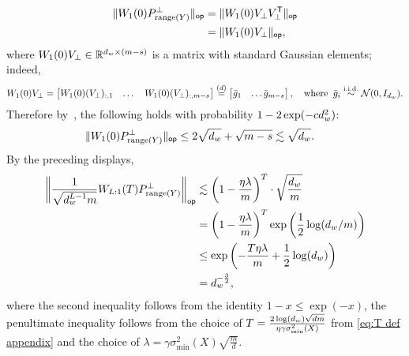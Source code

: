 \begin{align*}
    \lVert W_{1}(0) P_{\mathrm{range}(Y)}^{\perp}\rVert_{\mathsf{op}} &=
    \lVert W_{1}(0) V_{\perp} V_{\perp}^{\mathsf{T}}\rVert_{\mathsf{op}} \\
    &=
    \lVert W_{1}(0) V_{\perp}\rVert_{\mathsf{op}},
\end{align*}
where $W_{1}(0) V_{\perp} \in \mathbb{R}^{d_{w} \times (m - s)}$ is a matrix with standard Gaussian elements; indeed,
\[
    W_{1}{(0)} V_{\perp} = \begin{bmatrix}
        W_{1}(0) (V_{\perp})_{:, 1} &
        \dots &
        W_{1}(0) (V_{\perp})_{:, m - s}
    \end{bmatrix} \overset{(d)}{=}
    \begin{bmatrix}
        \bar{g}_1 & \dots \bar{g}_{m - s}
    \end{bmatrix},
    \quad \text{where} \;\;
    \bar{g}_i \overset{\mathrm{i.i.d.}}{\sim} \mathcal{N}(0, I_{d_{w}}).
\]
Therefore by~\citep[Corollary 7.3.3]{Ver18}, the following holds
with probability $1-2\exp(-c d_{w}^2)$:
\begin{align*}
	\lVert W_{1}(0) P_{\mathrm{range}(Y)}^{\perp}\rVert_{\mathsf{op}} & \leq
    2\sqrt{d_{w}} + \sqrt{m - s}
    \lesssim \sqrt{d_{w}}.
\end{align*}
By the preceding displays,
\begin{align}
	\opnorm[\bigg]{\frac{1}{\sqrt{\dhid^{L-1} \din}} W_{L:1}(T) P_{\range(Y)}^{\perp}}
	 & \lesssim \left(1 - \frac{\eta \lambda}{\din}\right)^{T}
	\cdot \sqrt{\frac{\dhid}{\din}}         \notag \\
	 & =  \left(1 - \frac{\eta \lambda}{\din}\right)^{T}
	\exp\left(\frac{1}{2} \log(\dhid / \din)\right) \notag \\
	 & \leq
	 \exp\left(-\frac{T \eta \lambda}{\din}
    + \frac{1}{2} \log(\dhid)
	\right)                                                       \notag \\
    &=  \dhid^{-\frac{3}{2}},
	\label{eq:W-perp-bound-refined}
\end{align} 
where the second inequality follows from the identity $1 - x \leq \exp(-x)$,
the penultimate inequality follows from the choice of $T = \frac{2\log(d_{w})\sqrt{dm}}{\eta\gamma \sigma_{\min}^2(X)}$ from \cref{eq:T def appendix} and the choice of $\lambda = \gamma \sigma_{\min}^2(X) \sqrt{\frac{m}{d}}$.


